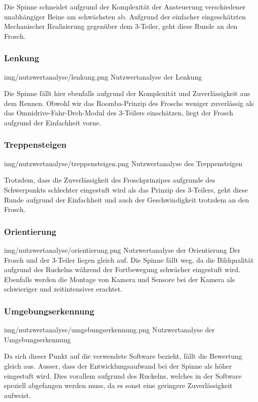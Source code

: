 Die Spinne schneidet aufgrund der Komplexität der Ansteuerung verschiedener unabhängiger Beine am schwächsten ab. Aufgrund der einfacher eingeschätzten Mechanischer Realisierung gegenüber dem 3-Teiler, geht diese Runde an den Frosch.
   
\subsubsection*{Lenkung}
\image
   {img/nutzwertanalyse/lenkung.png}
   {Nutzwertanalyse der Lenkung}
   
Die Spinne fällt hier ebenfalls aufgrund der Komplexität und Zuverlässigkeit aus dem Rennen. Obwohl wir das Roomba-Prinzip des Froschs weniger zuverlässig als das Omnidrive-Fahr-Dreh-Modul des 3-Teilers einschätzen, liegt der Frosch aufgrund der Einfachheit vorne.
   
\subsubsection*{Treppensteigen}
\image
   {img/nutzwertanalyse/treppensteigen.png}
   {Nutzwertanalyse des Treppensteigen}
   
Trotzdem, dass die Zuverlässigkeit des Froschprinzipes aufgrunde des Schwerpunkts schlechter eingestuft wird als das Prinzip des 3-Teilers, geht diese Runde aufgrund der Einfachheit und auch der Geschwindigkeit trotzdem an den Frosch.
   
\subsubsection*{Orientierung}
\image
   {img/nutzwertanalyse/orientierung.png}
   {Nutzwertanalyse der Orientierung}
   Der Frosch und der 3-Teiler liegen gleich auf. Die Spinne fällt weg, da die Bildqualität aufgrund des Ruckelns während der Fortbewegung schwächer eingestuft wird. Ebenfalls werden die Montage von Kamera und Sensore bei der Kamera als schwieriger und zeitintensiver erachtet.
   
\subsubsection*{Umgebungserkennung}
\image
   {img/nutzwertanalyse/umgebungserkennung.png}
   {Nutzwertanalyse der Umgebungserkennung}
   
Da sich dieser Punkt auf die verwendete Software bezieht, fällt die Bewertung gleich aus. Ausser, dass der Entwicklungsaufwand bei der Spinne als höher eingestuft wird. Dies vorallem aufgrund des Ruckelns, welches in der Software speziell abgefangen werden muss, da es sonst eine geringere Zuverlässigkeit aufweist. 
   
